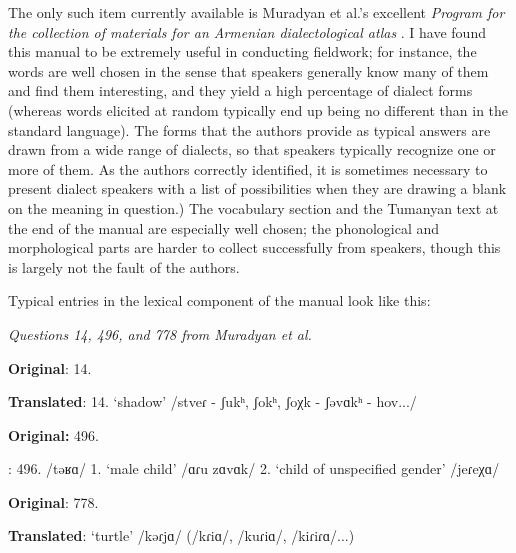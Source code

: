 \documentclass[output=paper]{langscibook}
\begin{document}
The only such item currently available is Muradyan et al.'s excellent \textit{Program for the collection of materials for an Armenian dialectological atlas} \citep{MuradyanEtAl-1977-DialectologyBook}. I have found this manual to be extremely useful in conducting fieldwork; for instance, the words are well chosen in the sense that speakers generally know many of them and find them interesting, and they yield a high percentage of dialect forms (whereas words elicited at random typically end up being no different than in the standard language). The forms that the authors provide as typical answers are drawn from a wide range of dialects, so that speakers typically recognize one or more of them.  As the authors correctly identified, it is sometimes necessary to present dialect speakers with a list of possibilities when they are drawing a blank on the meaning in question.) The vocabulary section and the Tumanyan text at the end of the manual are especially well chosen; the phonological and morphological parts are harder to collect successfully from speakers, though this is largely not the fault of the authors.

Typical entries in the lexical component of the manual look like this:


\begin{exe} \ex 
\textit{Questions 14, 496, and 778 from Muradyan et al. \citep{MuradyanEtAl-1977-DialectologyBook}}\label{vaux:ex:muradyanshadow}

 \begin{xlist}
   \ex  \textbf{Original}: 14.  \label{vaux:ex:muradyanshadow:shadow}
	
 

\textbf{Translated}: 14. 	`shadow' /stveɾ - ʃukʰ, ʃokʰ, ʃoχk - ʃǝvɑkʰ - hov.../

\item \textbf{Original:} 496.  \label{vaux:ex:muradyanshadow:kid}

\ex: 496. /təʁɑ/ 1. `male child' /ɑɾu zɑvɑk/   2. `child of unspecified gender' /jeɾeχɑ/  

\ex \textbf{Original}: 778.  \label{vaux:ex:muradyanshadow:turtle}

\textbf{Translated}: `turtle' /kǝɾjɑ/ (/kɾiɑ/, /kuɾiɑ/, /kiɾiɾɑ/...)  
	
\end{xlist}
 	
\end{exe}
\end{document}
